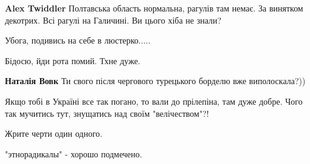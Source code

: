 \begin{itemize}
\begin{itemize}
\textbf{Alex Twiddler} Полтавська область нормальна, рагулів там немає. За
винятком декотрих. Всі рагулі на Галичині. Ви цього хіба не знали?

\end{itemize}


Убога, подивись на себе в люстерко.....


Бідосю, йди рота помий. Тхне дуже.

\begin{itemize}

\textbf{Наталія Вовк} Ти свого після чергового турецького борделю вже виполоскала?))
\end{itemize}


Якщо тобі в Україні все так погано, то вали до прілепіна, там дуже добре. Чого
так мучитись тут, знущатись над своїм "велічеством"?!


Жрите черти один одного.


"этнорадикалы" - хорошо подмечено.

\end{itemize}

